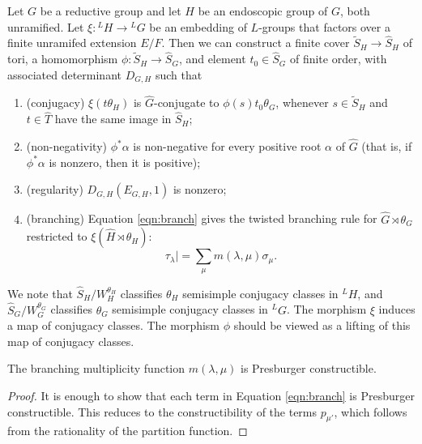 \begin{theorem}
Let $G$ be a reductive group and let $H$ be an endoscopic group of $G$, both unramified.
Let $\xi:{}^LH\to {}^LG$ be an embedding of $L$-groups that factors over a finite
unramifed extension $E/F$.  Then we can construct a finite cover $\tilde S_H\to \hat S_H$ of tori,
a homomorphism $\phi:\tilde S_H\to \hat S_G$, and element $t_0\in \hat S_G$ of finite order, with
associated determinant $D_{G,H}$ such that
\begin{enumerate}
\item (conjugacy) $\xi(t\theta_H)$ is $\hat G$-conjugate to $\phi(s) t_0\theta_G$,
whenever $s\in \tilde S_H$ and $t\in \hat T$ have the same image in $\hat S_H$;
\item  (non-negativity) $\phi^*\alpha$ is non-negative for every positive
root $\alpha$ of $\hat G$ (that is, if $\phi^*\alpha$ is nonzero, then it is positive);
\item  (regularity) $D_{G,H}(E_{G,H},1)$ is nonzero;
\item (branching) Equation \ref{eqn:branch} gives the twisted branching rule for $\hat G\rtimes \theta_G$ restricted to $\xi(\hat H\rtimes \theta_H)$:
\[
\tau_\lambda| = \sum_\mu m(\lambda,\mu) \sigma_\mu.
\]
\end{enumerate}
\end{theorem}

We note that $\hat S_H/W_H^{\theta_H}$ classifies $\theta_H$ semisimple conjugacy classes in ${}^LH$,
 and $\hat S_G/W_G^{\theta_G}$ classifies $\theta_G$
semisimple conjugacy classes in ${}^LG$.  The morphism $\xi$ induces a map of conjugacy classes.
The morphism $\phi$ should be viewed as a lifting of this map of conjugacy classes.

\begin{corollary} The branching multiplicity function $m(\lambda,\mu)$ is Presburger constructible.
\end{corollary}

\begin{proof} It is enough to show that each term in Equation \ref{eqn:branch} is Presburger constructible.
This reduces to the constructibility of the terms  $p_{\mu'}$, which follows from the
rationality of the partition function.
\end{proof}

